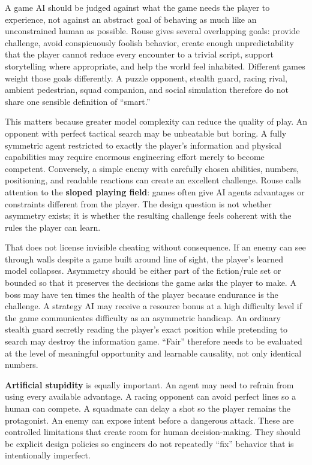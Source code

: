 A game AI should be judged against what the game needs the player to experience, not against an abstract goal of behaving as much like an unconstrained human as possible. Rouse gives several overlapping goals: provide challenge, avoid conspicuously foolish behavior, create enough unpredictability that the player cannot reduce every encounter to a trivial script, support storytelling where appropriate, and help the world feel inhabited. Different games weight those goals differently. A puzzle opponent, stealth guard, racing rival, ambient pedestrian, squad companion, and social simulation therefore do not share one sensible definition of ``smart.''

This matters because greater model complexity can reduce the quality of play. An opponent with perfect tactical search may be unbeatable but boring. A fully symmetric agent restricted to exactly the player's information and physical capabilities may require enormous engineering effort merely to become competent. Conversely, a simple enemy with carefully chosen abilities, numbers, positioning, and readable reactions can create an excellent challenge. Rouse calls attention to the \textbf{sloped playing field}: games often give AI agents advantages or constraints different from the player. The design question is not whether asymmetry exists; it is whether the resulting challenge feels coherent with the rules the player can learn.

That does not license invisible cheating without consequence. If an enemy can see through walls despite a game built around line of sight, the player's learned model collapses. Asymmetry should be either part of the fiction/rule set or bounded so that it preserves the decisions the game asks the player to make. A boss may have ten times the health of the player because endurance is the challenge. A strategy AI may receive a resource bonus at a high difficulty level if the game communicates difficulty as an asymmetric handicap. An ordinary stealth guard secretly reading the player's exact position while pretending to search may destroy the information game. ``Fair'' therefore needs to be evaluated at the level of meaningful opportunity and learnable causality, not only identical numbers.

\textbf{Artificial stupidity} is equally important. An agent may need to refrain from using every available advantage. A racing opponent can avoid perfect lines so a human can compete. A squadmate can delay a shot so the player remains the protagonist. An enemy can expose intent before a dangerous attack. These are controlled limitations that create room for human decision-making. They should be explicit design policies so engineers do not repeatedly ``fix'' behavior that is intentionally imperfect.

